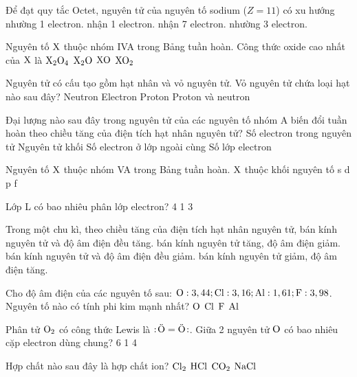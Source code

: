 \documentclass[11pt,a4paper]{article}
\begin{document}
\begin{ex}
Để đạt quy tắc Octet, nguyên tử của nguyên tố sodium ($Z=11$) có xu hướng
\choice
{\True nhường 1 electron.}
{nhận 1 electron.}
{nhận 7 electron.}
{nhường 3 electron.}
\end{ex}
\begin{ex}
Nguyên tố $\ce{X}$ thuộc nhóm IVA trong Bảng tuần hoàn. Công thức oxide cao nhất của $\ce{X}$ là
\choice
{$\ce{X2O4}$}
{$\ce{X2O}$}
{$\ce{XO}$}
{\True $\ce{XO2}$}
\end{ex}
\begin{ex}
Nguyên tử có cấu tạo gồm hạt nhân và vỏ nguyên tử. Vỏ nguyên tử chứa loại hạt nào sau đây?
\choice
{Neutron}
{\True Electron}
{Proton}
{Proton và neutron}
\end{ex}
\begin{ex}
Đại lượng nào sau đây trong nguyên tử của các nguyên tố nhóm A biến đổi tuần hoàn theo chiều tăng của điện tích hạt nhân nguyên tử?
\choice
{Số electron trong nguyên tử}
{Nguyên tử khối}
{\True Số electron ở lớp ngoài cùng}
{Số lớp electron}
\end{ex}
\begin{ex}
Nguyên tố $\ce{X}$ thuộc nhóm VA trong Bảng tuần hoàn. $\ce{X}$ thuộc khối nguyên tố
\choice
{s}
{d}
{\True p}
{f}
\end{ex}
\begin{ex}
Lớp L có bao nhiêu phân lớp electron?
\choice
{4}
{}
{1}
{3}
\end{ex}
\begin{ex}
Trong một chu kì, theo chiều tăng của điện tích hạt nhân nguyên tử,
\choice
{bán kính nguyên tử và độ âm điện đều tăng.}
{bán kính nguyên tử tăng, độ âm điện giảm.}
{bán kính nguyên tử và độ âm điện đều giảm.}
{\True bán kính nguyên tử giảm, độ âm điện tăng.}
\end{ex}
\begin{ex}
Cho độ âm điện của các nguyên tố sau: $\ce{O}: 3,44; \ce{Cl}: 3,16; \ce{Al}: 1,61; \ce{F}: 3,98$. Nguyên tố nào có tính phi kim mạnh nhất?
\choice
{$\ce{O}$}
{$\ce{Cl}$}
{\True $\ce{F}$}
{$\ce{Al}$}
\end{ex}
\begin{ex}
Phân tử $\ce{O2}$ có công thức Lewis là $:\!\ddot{\ce{O}}=\ddot{\ce{O}}\!:$. Giữa 2 nguyên tử $\ce{O}$ có bao nhiêu cặp electron dùng chung?
\choice
{6}
{1}
{4}
{}
\end{ex}
\begin{ex}
Hợp chất nào sau đây là hợp chất ion?
\choice
{$\ce{Cl2}$}
{$\ce{HCl}$}
{$\ce{CO2}$}
{\True $\ce{NaCl}$}
\end{ex}
\end{document}
